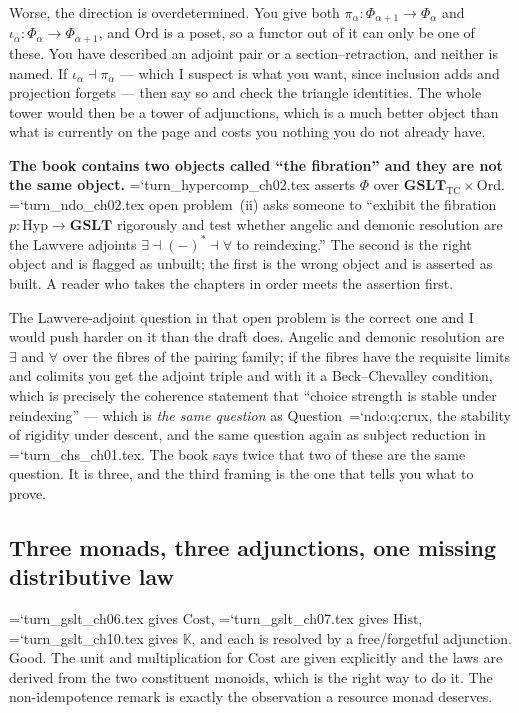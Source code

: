 \documentclass[11pt,letterpaper]{article}
\newcommand{\loc}[1]{{\small\ttfamily\color{accent}\hyphenchar\font=`\-\relax #1}}
\newcommand{\fnd}[1]{\textbf{\color{warn}#1}}
\begin{document}
Worse, the direction is overdetermined. You give both
$\pi_\alpha : \Phi_{\alpha+1} \to \Phi_\alpha$ and
$\iota_\alpha : \Phi_\alpha \to \Phi_{\alpha+1}$, and $\mathrm{Ord}$
is a poset, so a functor out of it can only be one of these. You have
described an adjoint pair or a section--retraction, and neither is
named. If $\iota_\alpha \dashv \pi_\alpha$ --- which I suspect is what
you want, since inclusion adds and projection forgets --- then say so
and check the triangle identities. The whole tower would then be a
tower of adjunctions, which is a much better object than what is
currently on the page and costs you nothing you do not already have.

\begin{flag}
\fnd{The book contains two objects called ``the fibration'' and they
are not the same object.} \loc{turn\_hypercomp\_ch02.tex} asserts
$\Phi$ over $\mathbf{GSLT}_{\mathrm{TC}} \times \mathrm{Ord}$.
\loc{turn\_ndo\_ch02.tex} open problem~(ii) asks someone to
``exhibit the fibration $p : \mathrm{Hyp} \to \mathbf{GSLT}$
rigorously and test whether angelic and demonic resolution are the
Lawvere adjoints $\exists \dashv (-)^{*} \dashv \forall$ to
reindexing.'' The second is the right object and is flagged as
unbuilt; the first is the wrong object and is asserted as built.
A reader who takes the chapters in order meets the assertion first.
\end{flag}

The Lawvere-adjoint question in that open problem is the correct one
and I would push harder on it than the draft does. Angelic and demonic
resolution are $\exists$ and $\forall$ over the fibres of the pairing
family; if the fibres have the requisite limits and colimits you get
the adjoint triple and with it a Beck--Chevalley condition, which is
precisely the coherence statement that ``choice strength is stable
under reindexing'' --- which is \emph{the same question} as
Question~\loc{ndo:q:crux}, the stability of rigidity under descent, and
the same question again as subject reduction in
\loc{turn\_chs\_ch01.tex}. The book says twice that two of these are
the same question. It is three, and the third framing is the one that
tells you what to prove.

\subsection*{Three monads, three adjunctions, one missing distributive law}

\loc{turn\_gslt\_ch06.tex} gives $\mathrm{Cost}$,
\loc{turn\_gslt\_ch07.tex} gives $\mathrm{Hist}$,
\loc{turn\_gslt\_ch10.tex} gives $\mathbb{K}$, and each is resolved by
a free/forgetful adjunction. Good. The unit and multiplication for
$\mathrm{Cost}$ are given explicitly and the laws are derived from the
two constituent monoids, which is the right way to do it. The
non-idempotence remark is exactly the observation a resource monad
deserves.
\end{document}
